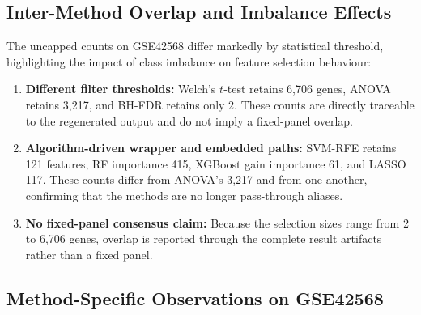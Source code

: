 \fi

\subsection{Inter-Method Overlap and Imbalance Effects}

The uncapped counts on GSE42568 differ markedly by statistical threshold, highlighting the impact of class imbalance on feature selection behaviour:

\begin{enumerate}
    \item \textbf{Different filter thresholds:} Welch's $t$-test retains 6,706 genes, ANOVA retains 3,217, and BH-FDR retains only 2. These counts are directly traceable to the regenerated output and do not imply a fixed-panel overlap.

    \item \textbf{Algorithm-driven wrapper and embedded paths:} SVM-RFE retains 121 features, RF importance 415, XGBoost gain importance 61, and LASSO 117. These counts differ from ANOVA's 3,217 and from one another, confirming that the methods are no longer pass-through aliases.

    \item \textbf{No fixed-panel consensus claim:} Because the selection sizes range from 2 to 6,706 genes, overlap is reported through the complete result artifacts rather than a fixed panel.
\end{enumerate}

\subsection{Method-Specific Observations on GSE42568}

